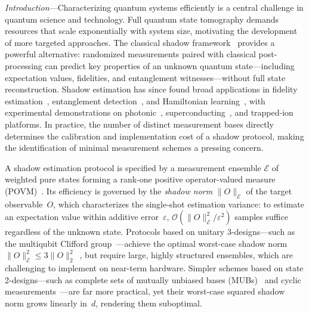 \documentclass[aps,pra,twocolumn,nofootinbib,superscriptaddress,10pt]{revtex4-2}
\newcommand{\caE}{\mathcal{E}}
\newcommand{\caO}{\mathcal{O}}
\begin{document}
	\maketitle
	
	
	
\emph{Introduction}---Characterizing quantum systems efficiently is a central challenge in quantum science and technology. Full quantum state tomography demands resources that scale exponentially with system size, motivating the development of more targeted approaches. The classical shadow framework~\cite{HuangKP20} provides a powerful alternative: randomized measurements paired with classical post-processing can predict key properties of an unknown quantum state---including expectation values, fidelities, and entanglement witnesses---without full state reconstruction. Shadow estimation has since found broad applications in fidelity estimation~\cite{Elben20,YangCZ25,Eisert20,Kliesch21}, entanglement detection~\cite{Brydges19,ElbenAK20,Zhou20,Neven21,Liu23,YiLZ26}, and Hamiltonian learning~\cite{Bairey19,Anshu20,Hadfield22,Huang23}, with experimental demonstrations on photonic~\cite{Struchalin21, Zhang21}, superconducting~\cite{HuangB22,Hu25}, and trapped-ion~\cite{Brydges19,Stricker22} platforms. In practice, the number of distinct measurement bases directly determines the calibration and implementation cost of a shadow protocol, making the identification of minimal measurement schemes a pressing concern.

 
A shadow estimation protocol is specified by a measurement ensemble $\caE$ of weighted pure states forming a rank-one positive operator-valued measure (POVM)~\cite{HuangKP20,InnocentiLP23,Nguyen22}. Its efficiency is governed by the \emph{shadow norm} $\|O\|_\caE$ of the target observable~$O$, which characterizes the single-shot estimation variance: to estimate an expectation value within additive error~$\varepsilon$, $\caO(\|O\|_\caE^2/\varepsilon^2)$ samples suffice regardless of the unknown state. Protocols based on unitary 3-designs---such as the multiqubit Clifford group~\cite{Zhu17,Webb16}---achieve the optimal worst-case shadow norm $\|O\|_\caE^2\leq 3\|O\|_2^2$~\cite{HuangKP20}, but require large, highly structured ensembles, which are challenging to implement on near-term hardware. Simpler schemes based on state 2-designs---such as complete sets of mutually unbiased bases (MUBs)~\cite{DURT10,Ivanovic81,Wootters89} and cyclic measurements~\cite{Gonzalez25}---are far more practical, yet their worst-case squared shadow norm grows linearly in~$d$, rendering them suboptimal.
\end{document}
